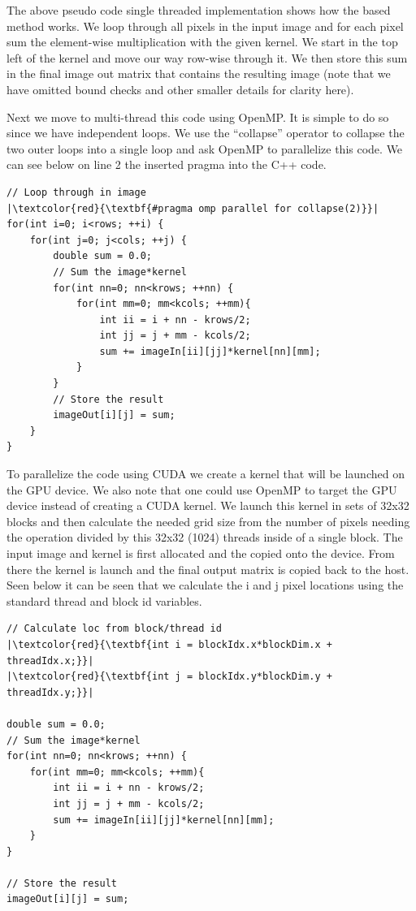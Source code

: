 \documentclass{article}
\begin{document}
The above pseudo code single threaded implementation shows how the based method works.
We loop through all pixels in the input image and for each pixel sum the element-wise multiplication with the given kernel.
We start in the top left of the kernel and move our way row-wise through it.
We then store this sum in the final image out matrix that contains the resulting image (note that we have omitted bound checks and other smaller details for clarity here).

Next we move to multi-thread this code using OpenMP.
It is simple to do so since we have independent loops.
We use the ``collapse'' operator to collapse the two outer loops into a single loop and ask OpenMP to parallelize this code.
We can see below on line 2 the inserted pragma into the C++ code.

\begin{verbatim}
// Loop through in image
|\textcolor{red}{\textbf{#pragma omp parallel for collapse(2)}}|
for(int i=0; i<rows; ++i) {
	for(int j=0; j<cols; ++j) {
		double sum = 0.0;
		// Sum the image*kernel
		for(int nn=0; nn<krows; ++nn) {
			for(int mm=0; mm<kcols; ++mm){
				int ii = i + nn - krows/2;
				int jj = j + mm - kcols/2;
				sum += imageIn[ii][jj]*kernel[nn][mm];
			}
		}
		// Store the result
		imageOut[i][j] = sum;
	}
}
\end{verbatim}

To parallelize the code using CUDA we create a kernel that will be launched on the GPU device.
We also note that one could use OpenMP to target the GPU device instead of creating a CUDA kernel.
We launch this kernel in sets of 32x32 blocks and then calculate the needed grid size from the number of pixels needing the operation divided by this 32x32 (1024) threads inside of a single block.
The input image and kernel is first allocated and the copied onto the device.
From there the kernel is launch and the final output matrix is copied back to the host.
Seen below it can be seen that we calculate the i and j pixel locations using the standard thread and block id variables.

\begin{verbatim}
// Calculate loc from block/thread id
|\textcolor{red}{\textbf{int i = blockIdx.x*blockDim.x + threadIdx.x;}}|
|\textcolor{red}{\textbf{int j = blockIdx.y*blockDim.y + threadIdx.y;}}|

double sum = 0.0;
// Sum the image*kernel
for(int nn=0; nn<krows; ++nn) {
	for(int mm=0; mm<kcols; ++mm){
		int ii = i + nn - krows/2;
		int jj = j + mm - kcols/2;
		sum += imageIn[ii][jj]*kernel[nn][mm];
	}
}

// Store the result
imageOut[i][j] = sum;
\end{verbatim}
\end{document}
